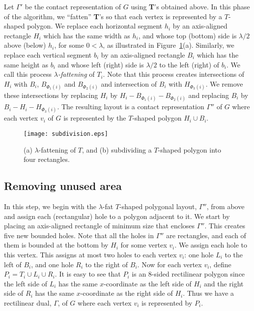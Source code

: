 \documentclass[11pt]{article}
\begin{document}
Let $\Gamma'$ be the contact representation of $G$ using \textbf{T}'s obtained above. In this
 phase of the algorithm, we ``fatten'' \textbf{T}'s
 so that each vertex is represented by a $T$-shaped polygon. We
 replace each horizontal segment $h_i$ by an axis-aligned rectangle
 $H_i$ which has the same width as $h_i$, and whose top
 (bottom) side is $\lambda /2$ above (below) $h_i$, for some $0<\lambda$,
 as illustrated in Figure~\ref{fig:subdivision}(a).
 Similarly, we replace each vertical segment $b_i$ by an
 axis-aligned rectangle $B_i$ which has the same height as $b_i$ and whose left (right) side is $\lambda /2$ to the left (right) of $b_i$.
 We call this process \textit{$\lambda$-fattening} of $T_i$. Note that
 this process creates intersections of $H_i$ with $B_i$,
 $B_{\Phi_1(i)}$ and $B_{\Phi_2(i)}$ and intersection of $B_i$ with $H_{\Phi_3(i)}$. We remove these intersections
 by replacing $H_i$ by $H_i-B_{\Phi_1(i)}-B_{\Phi_2(i)}$ and replacing $B_i$ by $B_i-H_i- H_{\Phi_3(i)}$. The
 resulting layout is a contact representation $\Gamma ''$ of $G$ where each vertex $v_i$ of $G$ is
 represented by the $T$-shaped polygon $H_i\cup B_i$.


\begin{figure}[htbp]
\centering
\texttt{[image: subdivision.eps]}
\caption{\small\sf (a) $\lambda$-fattening of $T$, and (b) subdividing a $T$-shaped polygon into four rectangles.}
\label{fig:subdivision}
\end{figure}



\subsection{Removing unused area}

In this step, we begin with the $\lambda$-fat $T$-shaped polygonal
layout, $\Gamma ''$, from above and
assign each
(rectangular) hole to a polygon adjacent to it. We start by placing an axis-aligned
 rectangle of minimum size that encloses $\Gamma ''$. This creates five new bounded holes.
Note that all the holes in $\Gamma ''$ are rectangles, and
each of them is bounded at the bottom by $H_i$ for some vertex $v_i$.
We assign each hole to this vertex.  This assigns at most two holes
to each vertex $v_i$: one hole $L_i$ to the left of $B_i$, and one
hole $R_i$ to the right of $B_i$.
Now for each
vertex $v_i$, define $P_i=T_i\cup L_i\cup R_i$. It is easy to see
 that $P_i$ is an 8-sided rectilinear polygon since the left side of $L_i$ has the same $x$-coordinate as the left side
 of $H_i$ and the right side of $R_i$ has the same $x$-coordinate as
 the right side of $H_i$. Thus we have a rectilinear dual, $\Gamma$,
 of $G$ where each vertex $v_i$ is represented by $P_i$.
\end{document}
